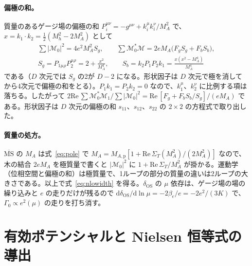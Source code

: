 \documentclass[a4paper,10pt]{ltjsarticle}
\newcommand{\dd}{\mathrm{d}}
\newcommand{\MSbar}{\overline{\mathrm{MS}}}
\newcommand{\re}{\mathrm{Re}\,}
\begin{document}
\paragraph{偏極の和。}質量のあるゲージ場の偏極の和 $P_i^{\mu\nu}=-g^{\mu\nu}+k_i^\mu k_i^\nu/M_A^2$ で、$x=k_1\cdot k_2=\frac12(M_h^2-2M_A^2)$ として
\begin{equation*}
\begin{gathered}
\sum|\mathcal M_0|^2=4e^2M_A^2S_g,\qquad
\sum\mathcal M_0^*\mathcal M=2eM_A\bigl(F_gS_g+F_bS_b\bigr),\\
S_g=P_{1\mu\rho}P_2^{\mu\rho}=2+\frac{x^2}{M_A^4},\qquad
S_b=k_2P_1P_2k_1=\frac{x(x^2-M_A^4)}{M_A^4}
\end{gathered}
\end{equation*}
である（$D$ 次元では $S_g$ の2が $D-2$ になる。形状因子は $D$ 次元で極を消してから4次元で偏極の和をとる）。$P_1k_1=P_2k_2=0$ なので、$k_1^\mu$、$k_2^\nu$ に比例する項は落ちる。したがって $2\re\sum\mathcal M_0^*\mathcal M_1/\sum|\mathcal M_0|^2=\re[F_g+F_bS_b/S_g]/(eM_A)$ である。形状因子は $D$ 次元の偏極の和 $s_{11}$、$s_{12}$、$s_{22}$ の $2\times2$ の方程式で取り出した。

\paragraph{質量の処方。}$\MSbar$ の $M_A$ は式~\eqref{eq:pole} で $M_A=M_{A,\mathrm p}[1+\re\Sigma_T(M_A^2)/(2M_A^2)]$ なので、木の結合 $2eM_A$ を極質量で書くと $|\mathcal M_0|^2$ に $1+\re\Sigma_T/M_A^2$ が掛かる。運動学（位相空間と偏極の和）は極質量で、1ループの部分の質量の違いは2ループの大きさである。以上で式~\eqref{eq:nlowidth} を得る。$\delta_{\mathrm{OS}}$ の $\mu$ 依存は、ゲージ場の場の繰り込みと $e$ の走りだけが残るので $\dd\delta_{\mathrm{OS}}/\dd\ln\mu=-2\beta_e/e=-2e^2/(3K)$ で、$\Gamma_0\propto e^2(\mu)$ の走りを打ち消す。

\section{有効ポテンシャルと Nielsen 恒等式の導出}\label{app:effpot}
\end{document}
